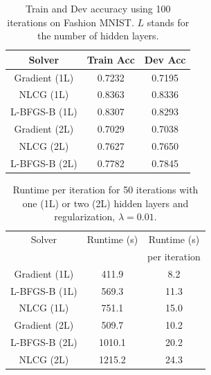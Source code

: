 \documentclass[11pt,twocolumn]{article}
\begin{document}
\begin{table}[h!]
\begin{center}
\begin{tabular}{ ccc} %
\hline
Solver & Train Acc & Dev Acc  \\ 
\hline 
\hline
Gradient (1L) & 0.7232 & 0.7195\\ 
NLCG (1L)& 0.8363 & 0.8336\\ 
L-BFGS-B (1L)& 0.8307 & 0.8293\\ 
Gradient (2L)& 0.7029 & 0.7038\\ 
NLCG (2L)& 0.7627 & 0.7650\\ 
L-BFGS-B (2L)& 0.7782 & 0.7845\\ 
\end{tabular}
\end{center}
\caption{Train and Dev accuracy using 100 iterations on Fashion MNIST. $L$ stands for the number of hidden layers.}\label{table_fashion_mnist}
\end{table}

\begin{table}[h!]
\begin{center}
\begin{tabular}{ ccc} %
\hline
Solver & Runtime (s) & Runtime (s)  \\ 
& &per iteration \\
\hline 
\hline
Gradient (1L)& 411.9 & 8.2\\ 
L-BFGS-B (1L)& 569.3  & 11.3\\ 
NLCG (1L)& 751.1 & 15.0 \\ 
Gradient (2L)& 509.7 & 10.2 \\ 
L-BFGS-B (2L)& 1010.1  & 20.2\\ 
NLCG (2L)& 1215.2 & 24.3 \\ \end{tabular}
\end{center}
\caption{Runtime per iteration for 50 iterations with one (1L) or two (2L) hidden layers and regularization, $\lambda = 0.01$.}\label{rt_nn}
\end{table}
\end{document}
